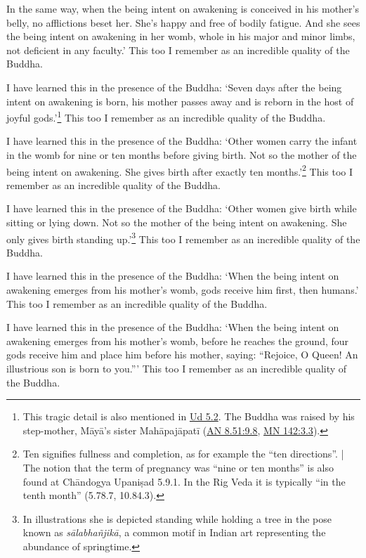 \documentclass[12pt,openany]{book}%
\begin{document}
In the same way, when the being intent on awakening is conceived in his mother’s belly, no afflictions beset her. She’s happy and free of bodily fatigue. And she sees the being intent on awakening in her womb, whole in his major and minor limbs, not deficient in any faculty.’ This too I remember as an incredible quality of the Buddha. 

I have learned this in the presence of the Buddha: ‘Seven days after the being intent on awakening is born, his mother passes away and is reborn in the host of joyful gods.’\footnote{This tragic detail is also mentioned in \href{https://suttacentral.net/ud5.2/en/sujato}{Ud 5.2}. The Buddha was raised by his step-mother, \textsanskrit{Māyā}’s sister \textsanskrit{Mahāpajāpatī} (\href{https://suttacentral.net/an8.51/en/sujato\#9.8}{AN 8.51:9.8}, \href{https://suttacentral.net/mn142/en/sujato\#3.3}{MN 142:3.3}). } This too I remember as an incredible quality of the Buddha. 

I have learned this in the presence of the Buddha: ‘Other women carry the infant in the womb for nine or ten months before giving birth. Not so the mother of the being intent on awakening. She gives birth after exactly ten months.’\footnote{Ten signifies fullness and completion, as for example the “ten directions”. | The notion that the term of pregnancy was “nine or ten months” is also found at \textsanskrit{Chāndogya} \textsanskrit{Upaniṣad} 5.9.1. In the Rig Veda it is typically “in the tenth month” (5.78.7, 10.84.3). } This too I remember as an incredible quality of the Buddha. 

I have learned this in the presence of the Buddha: ‘Other women give birth while sitting or lying down. Not so the mother of the being intent on awakening. She only gives birth standing up.’\footnote{In illustrations she is depicted standing while holding a tree in the pose known as \textit{\textsanskrit{sālabhañjikā}}, a common motif in Indian art representing the abundance of springtime. } This too I remember as an incredible quality of the Buddha. 

I have learned this in the presence of the Buddha: ‘When the being intent on awakening emerges from his mother’s womb, gods receive him first, then humans.’ This too I remember as an incredible quality of the Buddha. 

I have learned this in the presence of the Buddha: ‘When the being intent on awakening emerges from his mother’s womb, before he reaches the ground, four gods receive him and place him before his mother, saying: “Rejoice, O Queen! An illustrious son is born to you.”’ This too I remember as an incredible quality of the Buddha. 
\end{document}

